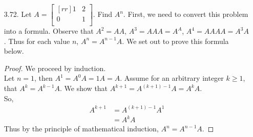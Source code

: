 \documentclass[12pt]{article}
\begin{document}
\begin{enumerate}
\item [3.72.] Let $A= \begin{bmatrix}[rr] 1 & 2\\ 0 & 1\\ \end{bmatrix}$. Find $A^n$.
	First, we need to convert this problem into a formula. Observe that $A^2=AA$, $A^3=AAA=A^A$, $A^4=AAAA=A^3A$. Thus for each value $n$, $A^n=A^{n-1}A$. We set out to prove this formula below.
	\begin{proof}
	We proceed by induction.\\
	Let $n=1$, then $A^1 = A^0A = 1A = A$. Assume for an arbitrary integer $k \geq 1$, that $A^k=A^{k-1}A$. We show that $A^{k+1} = A^{(k+1)-1}A = A^kA$.\\
	So,
		\begin{align*}
		A^{k+1} &= A^{(k+1)-1}A^1\\
		&= A^kA
		\end{align*}
	Thus by the principle of mathematical induction, $A^n = A^{n-1}A$.
	\end{proof}


\end{enumerate}
\end{document}
